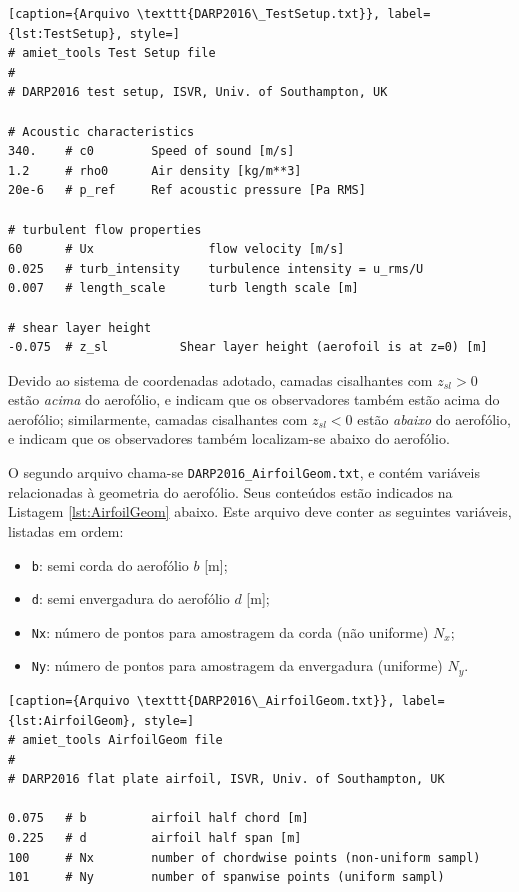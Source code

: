 \documentclass[a4paper, 11pt, twoside]{article}
\begin{document}
\begin{lstlisting}[caption={Arquivo \texttt{DARP2016\_TestSetup.txt}}, label={lst:TestSetup}, style=]
# amiet_tools Test Setup file
#
# DARP2016 test setup, ISVR, Univ. of Southampton, UK

# Acoustic characteristics
340.	# c0		Speed of sound [m/s]
1.2		# rho0		Air density [kg/m**3]
20e-6	# p_ref		Ref acoustic pressure [Pa RMS]

# turbulent flow properties
60		# Ux				flow velocity [m/s]
0.025	# turb_intensity	turbulence intensity = u_rms/U
0.007	# length_scale		turb length scale [m]

# shear layer height
-0.075	# z_sl			Shear layer height (aerofoil is at z=0) [m]
\end{lstlisting}

Devido ao sistema de coordenadas adotado, camadas cisalhantes com $z_{sl}>0$ estão \emph{acima} do aerofólio, e indicam que os observadores também estão acima do aerofólio; similarmente, camadas cisalhantes com $z_{sl}<0$ estão \emph{abaixo} do aerofólio, e indicam que os observadores também localizam-se abaixo do aerofólio.



O segundo arquivo chama-se \verb|DARP2016_AirfoilGeom.txt|, e contém variáveis relacionadas à geometria do aerofólio. Seus conteúdos estão indicados na Listagem \ref{lst:AirfoilGeom} abaixo. Este arquivo deve conter as seguintes variáveis, listadas em ordem:

\begin{itemize}
	\item \verb|b|: semi corda do aerofólio $b$ [m];
	\item \verb|d|: semi envergadura do aerofólio $d$ [m];
	\item \verb|Nx|: número de pontos para amostragem da corda (não uniforme) $N_x$;
	\item \verb|Ny|: número de pontos para amostragem da envergadura (uniforme) $N_y$.
\end{itemize}

\begin{lstlisting}[caption={Arquivo \texttt{DARP2016\_AirfoilGeom.txt}}, label={lst:AirfoilGeom}, style=]
# amiet_tools AirfoilGeom file
#
# DARP2016 flat plate airfoil, ISVR, Univ. of Southampton, UK

0.075	# b			airfoil half chord [m]
0.225	# d 		airfoil half span [m]
100		# Nx 		number of chordwise points (non-uniform sampl)
101		# Ny 		number of spanwise points (uniform sampl)
\end{lstlisting}
\end{document}
